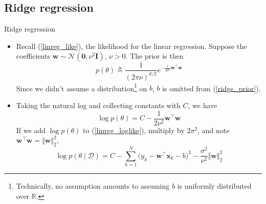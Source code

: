 \documentclass{beamer}
\numberwithin{equation}{section}
\newcommand{\aref}[1]{\alert{\ref{#1}}}
\begin{document}
\subsection{Ridge regression}

\begin{frame}{Ridge regression}
    \begin{itemize}
        \item
        Recall (\aref{linreg_like}), the likelihood for the linear regression.
        Suppose the coefficients $ \mathbf{w} \sim \mathcal{N}(\mathbf{0},
        \nu^2\mathbf{I}) $, $ \nu > 0 $. The prior is then
        \begin{equation} \label{ridge_prior}
            p(\theta) \triangleq \frac{1}{(2\pi\nu)^{d / 2}}
            e^{-\frac{1}{2\nu^2}\mathbf{w}^\top\mathbf{w}}
        \end{equation}
        Since we didn't assume a distribution\footnote{
            Technically, no assumption amounts to assuming $ b $ is
            uniformly distributed over $ \mathbb{R} $.
        } on $ b $, $ b $ is omitted from
        (\aref{ridge_prior}).

        \item
        Taking the natural log and collecting constants with $ C $, we have
        \begin{equation*}
            \log p(\theta) = C - \frac{1}{2\nu^2}\mathbf{w}^\top\mathbf{w}
        \end{equation*}
        If we add $ \log p(\theta) $ to (\aref{linreg_loglike}), multiply
        by $ 2\sigma^2 $, and note $ \mathbf{w}^\top\mathbf{w} =
        \Vert\mathbf{w}\Vert_2^2 $,
        \begin{equation*}
            \log p(\theta \mid \mathcal{D}) = C - \sum_{k = 1}^N
            \big(y_k - \mathbf{w}^\top\mathbf{x}_k - b\big)^2 -
            \frac{\sigma^2}{\nu^2}\Vert\mathbf{w}\Vert_2^2
        \end{equation*}
    \end{itemize}
\end{frame}
\end{document}
